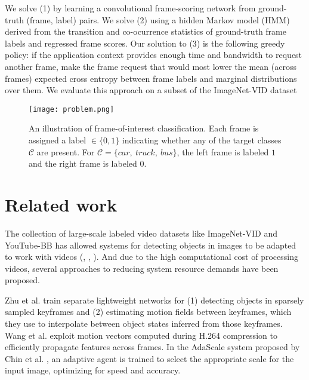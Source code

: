\documentclass[10pt,twocolumn,letterpaper]{article}
\begin{document}
We solve (1) by learning a convolutional frame-scoring network from ground-truth (frame, label) pairs. We solve (2) using a hidden Markov model (HMM) derived from the transition and co-ocurrence statistics of ground-truth frame labels and regressed frame scores. Our solution to (3) is the following greedy policy: if the application context provides enough time and bandwidth to request another frame, make the frame request that would most lower the mean (across frames) expected cross entropy \cite{murphy2012probabilistic} between frame labels and marginal distributions over them. We evaluate this approach on a subset of the ImageNet-VID dataset \cite{russakovsky2015imagenet}

\begin{figure}[t]
\begin{center}
    \texttt{[image: problem.png]}
\end{center}
   \caption{An illustration of frame-of-interest classification. Each frame is assigned a label $\in\{0,1\}$ indicating whether any of the target classes $\mathcal{C}$ are present. For $\mathcal{C} = \lbrace car,\ truck,\ bus \rbrace$, the left frame is labeled $1$ and the right frame is labeled $0$.}
\label{fig:long}
\label{fig:onecol}
\end{figure}

\section{Related work}

The collection of large-scale labeled video datasets like ImageNet-VID \cite{russakovsky2015imagenet} and YouTube-BB \cite{real2017youtubeboundingboxes} has allowed systems for detecting objects in images to be adapted to work with videos (\cite{bertasius2018object}, \cite{Wang2018FullyMN}, \cite{Zhu_2018}). And due to the high computational cost of processing videos, several approaches to reducing system resource demands have been proposed.

Zhu et al. \cite{zhu2018highmob} train separate lightweight networks for (1) detecting objects in sparsely sampled keyframes and (2) estimating motion fields between keyframes, which they use to interpolate between object states inferred from those keyframes. Wang et al. \cite{wang2018fast} exploit motion vectors computed during H.264 compression to efficiently propagate features across frames. In the AdaScale system proposed by Chin et al. \cite{chin2019adascale}, an adaptive agent is trained to select the appropriate scale for the input image, optimizing for speed and accuracy.
\end{document}
